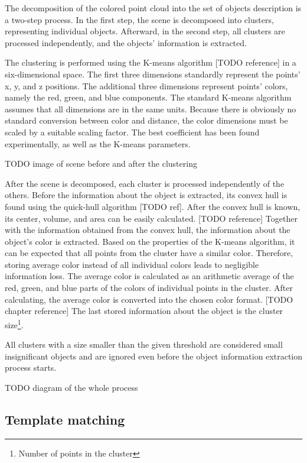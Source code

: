 The decomposition of the colored point cloud into the set of objects description is a two-step process. In the first step, the scene is decomposed into clusters, representing individual objects. Afterward, in the second step, all clusters are processed independently, and the objects' information is extracted.\par
The clustering is performed using the K-means algorithm [TODO reference] in a six-dimensional space. The first three dimensions standardly represent the points' x, y, and z positions. The additional three dimensions represent points' colors, namely the red, green, and blue components. The standard K-means algorithm assumes that all dimensions are in the same units. Because there is obviously no standard conversion between color and distance, the color dimensions must be scaled by a suitable scaling factor. The best coefficient has been found experimentally, as well as the K-means parameters.\par

TODO image of scene before and after the clustering

After the scene is decomposed, each cluster is processed independently of the others. Before the information about the object is extracted,  its convex hull is found using the quick-hull algorithm [TODO ref]. After the convex hull is known, its center, volume, and area can be easily calculated. [TODO reference] Together with the information obtained from the convex hull, the information about the object's color is extracted. Based on the properties of the K-means algorithm, it can be expected that all points from the cluster have a similar color. Therefore, storing average color instead of all individual colors leads to negligible information loss. The average color is calculated as an arithmetic average of the red, green, and blue parts of the colors of individual points in the cluster. After calculating, the average color is converted into the chosen color format. [TODO chapter reference] The last stored information about the object is the cluster size\footnote{Number of points in the cluster}.\par
All clusters with a size smaller than the given threshold are considered small insignificant objects and are ignored even before the object information extraction process starts.

TODO diagram of the whole process

\subsection{Template matching}

